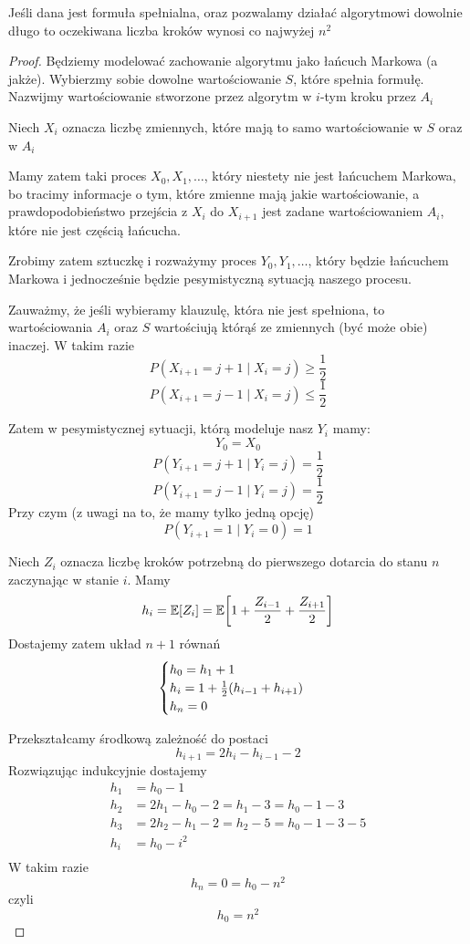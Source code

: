 \begin{theorem}[Lemat 7.1 P\&C]
	Jeśli dana jest formuła spełnialna, oraz pozwalamy działać algorytmowi dowolnie długo
	to oczekiwana liczba kroków wynosi co najwyżej \( n^2 \)
\end{theorem}
\begin{proof}
	Będziemy modelować zachowanie algorytmu jako łańcuch Markowa (a jakże).
	Wybierzmy sobie dowolne wartościowanie \( S \), które spełnia formułę.
	Nazwijmy wartościowanie stworzone przez algorytm w \(i\)-tym kroku przez \( A_i \)

	Niech \( X_i \) oznacza liczbę zmiennych, które mają to samo wartościowanie w \( S \) oraz w \( A_i \)

	Mamy zatem taki proces \( X_0, X_1, \dots \), który niestety nie jest łańcuchem Markowa, bo tracimy informacje o tym, które zmienne mają jakie wartościowanie, a prawdopodobieństwo przejścia z \( X_i \) do \( X_{i+1} \) jest zadane wartościowaniem \( A_i \), które nie jest częścią łańcucha.

	Zrobimy zatem sztuczkę i rozważymy proces \( Y_0, Y_1, \dots \), który będzie łańcuchem Markowa i jednocześnie będzie pesymistyczną sytuacją naszego procesu.

	Zauważmy, że jeśli wybieramy klauzulę, która nie jest spełniona, to wartościowania \( A_i \) oraz \( S \) wartościują którąś ze zmiennych (być może obie) inaczej.
	W takim razie
	\[
		P(X_{i+1} = j + 1 \mid X_i = j) \geq \frac{1}{2}
	\]
	\[
		P(X_{i+1} = j - 1 \mid X_i = j) \leq \frac{1}{2}
	\]

	Zatem w pesymistycznej sytuacji, którą modeluje nasz \( Y_i \) mamy:
	\[
		Y_0 = X_0
	\]
	\[
		P(Y_{i+1} = j + 1 \mid Y_i = j) = \frac{1}{2}
	\]
	\[
		P(Y_{i+1} = j - 1 \mid Y_i = j) = \frac{1}{2}
	\]
	Przy czym (z uwagi na to, że mamy tylko jedną opcję)
	\[
		P(Y_{i+1} = 1 \mid Y_i = 0) = 1
	\]

	Niech \( Z_i \) oznacza liczbę kroków potrzebną do pierwszego dotarcia do stanu \( n \) zaczynając w stanie \( i \).
	Mamy
	\[
		h_i = \expected{Z_i} = \expected{1 + \frac{Z_{i-1}}{2} + \frac{Z_{i+1}}{2}}
	\]
	Dostajemy zatem układ \( n + 1 \) równań
	\[
		\begin{cases}
			h_0 = h_1 + 1                                 \\
			h_i = 1 + \frac{1}{2}\pars{h_{i-1} + h_{i+1}} \\
			h_n = 0
		\end{cases}
	\]

	Przekształcamy środkową zależność do postaci
	\[
		h_{i + 1} = 2h_i - h_{i - 1} - 2
	\]
	Rozwiązując indukcyjnie dostajemy
	\begin{align*}
		h_1 & = h_0 - 1                                    \\
		h_2 & = 2h_1 - h_0 - 2 = h_1 - 3 = h_0 - 1 - 3     \\
		h_3 & = 2h_2 - h_1 - 2 = h_2 - 5 = h_0 - 1 - 3 - 5 \\
		h_i & = h_0 - i^2                                  \\
	\end{align*}
	W takim razie
	\[
		h_n = 0 = h_0 - n^2
	\]
	czyli \[ h_0 = n^2 \]


\end{proof}
